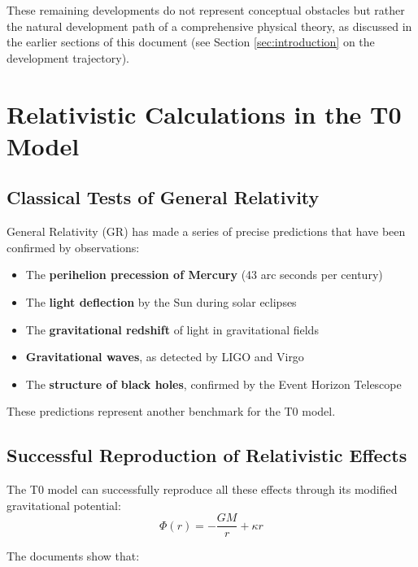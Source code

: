 \documentclass[12pt,a4paper]{article}
\begin{document}
	These remaining developments do not represent conceptual obstacles but rather the natural development path of a comprehensive physical theory, as discussed in the earlier sections of this document (see Section \ref{sec:introduction} on the development trajectory).
	
	\section{Relativistic Calculations in the T0 Model}
	\label{sec:relativistic_calculations}
	
	\subsection{Classical Tests of General Relativity}
	\label{subsec:gr_tests}
	
	General Relativity (GR) has made a series of precise predictions that have been confirmed by observations:
	
	\begin{itemize}
		\item The \textbf{perihelion precession of Mercury} (43 arc seconds per century)
		\item The \textbf{light deflection} by the Sun during solar eclipses
		\item The \textbf{gravitational redshift} of light in gravitational fields
		\item \textbf{Gravitational waves}, as detected by LIGO and Virgo
		\item The \textbf{structure of black holes}, confirmed by the Event Horizon Telescope
	\end{itemize}
	
	These predictions represent another benchmark for the T0 model.
	
	\subsection{Successful Reproduction of Relativistic Effects}
	\label{subsec:gr_reproduction}
	
	The T0 model can successfully reproduce all these effects through its modified gravitational potential:
	\begin{equation}
		\Phi(r) = -\frac{GM}{r} + \kappa r
	\end{equation}
	
	The documents show that:
	
\end{document}
